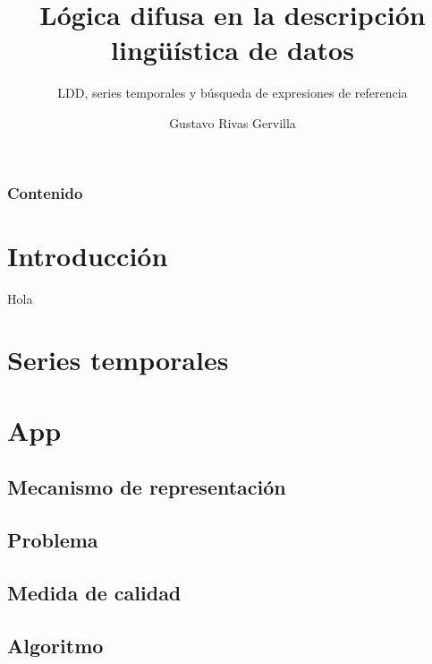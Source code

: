 \documentclass{beamer}
\date{} %
\author{Gustavo Rivas Gervilla}
\title{Lógica difusa en la descripción lingüística de datos}
\subtitle{LDD, series temporales y búsqueda de expresiones de referencia}
\institute{
	Escuela Técnica Superior de Ingeniería Informática y Telecomunicaciones	
}
\begin{document}
	\begin{frame}[plain]
		\titlepage
	\end{frame}
	
	\begin{frame}[plain]
		\frametitle{Contenido}
		\tableofcontents
	\end{frame}
	
	
	\section{Introducción}
	
	\begin{frame}
		Hola
	\end{frame}
	
	\section{Series temporales}
	
	\section{App}
	
	\subsection{Mecanismo de representación}
	\subsection{Problema}
	\subsection{Medida de calidad}
	\subsection{Algoritmo}
	
	
	
	
\end{document}
